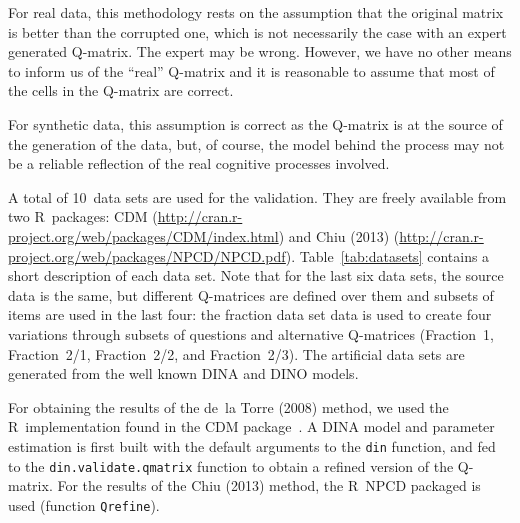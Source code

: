 For real data, this methodology rests on the assumption that the original matrix is better than the corrupted one, which is not necessarily the case with an expert generated Q-matrix. The expert may be wrong.  However, we have no other means to inform us of the ``real'' Q-matrix and it is reasonable to assume that most of the cells in the Q-matrix are correct.

For synthetic data, this assumption is correct as the Q-matrix is at the source of the generation of the data, but, of course, the model behind the process may not be a reliable reflection of the real cognitive processes involved.  

A total of 10~data sets are used for the validation.  They are freely available from two R~packages: CDM (\url{http://cran.r-project.org/web/packages/CDM/index.html}) \citep{Robitzsch2012} and Chiu (2013) (\url{http://cran.r-project.org/web/packages/NPCD/NPCD.pdf}).  Table~\ref{tab:datasets} contains a short description of each data set.  Note that for the last six data sets, the source data is the same, but different Q-matrices are defined over them and subsets of items are used in the last four: the fraction data set data is used to create four variations through subsets of questions and alternative Q-matrices (Fraction~1, Fraction~2/1, Fraction~2/2, and Fraction~2/3).  The artificial data sets are generated from the well known DINA and DINO models.

For obtaining the results of the de~la Torre (2008) method, we used the R~implementation found in the CDM package~\citep{Robitzsch2012}.  A DINA model and parameter estimation is first built with the default arguments to the \texttt{din} function, and fed to the \texttt{din.validate.qmatrix} function to obtain a refined version of the Q-matrix. For the results of the Chiu (2013) method, the R~NPCD packaged is used (function \texttt{Qrefine}).


